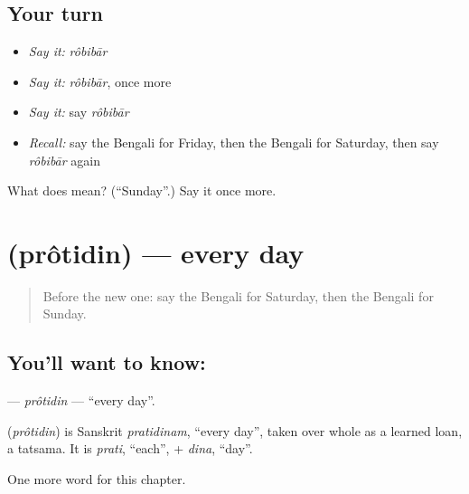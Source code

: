 \subsection*{Your turn}
\begin{itemize}
\raggedright
  \item \emph{Say it:} \emph{rôbibār}
  \item \emph{Say it:} \emph{rôbibār}, once more
  \item \emph{Say it:} say \emph{rôbibār}
  \item \emph{Recall:} say the Bengali for Friday, then the Bengali for Saturday, then say \emph{rôbibār} again
\end{itemize}

\begin{tcolorbox}[breakable,colback=teal!4,colframe=teal!35!black,title={Before you move on}]
What does  mean? (\textquotedblleft{}Sunday\textquotedblright{}.) Say it once more.
\end{tcolorbox}
\section[\texorpdfstring{\bn{প্রতিদিন} (prôtidin)}{প্রতিদিন (prôtidin)}]{ (prôtidin) — every day}

\label{lesson:BN-C92-protidin}



\begin{quote}
Before the new one: say the Bengali for Saturday, then the Bengali for Sunday.
\end{quote}

\subsection*{You'll want to know: }
\textbf{} — \emph{prôtidin} — \textquotedblleft{}every day\textquotedblright{}.

\begin{cousinweb}
\textbf{} (\emph{prôtidin}) is Sanskrit \emph{pratidinam}, \textquotedblleft{}every day\textquotedblright{}, taken over whole as a learned loan, a tatsama. It is \emph{prati}, \textquotedblleft{}each\textquotedblright{}, + \emph{dina}, \textquotedblleft{}day\textquotedblright{}.
\end{cousinweb}

\begin{grammarlens}[title={What you've built}]
One more word for this chapter.
\end{grammarlens}

